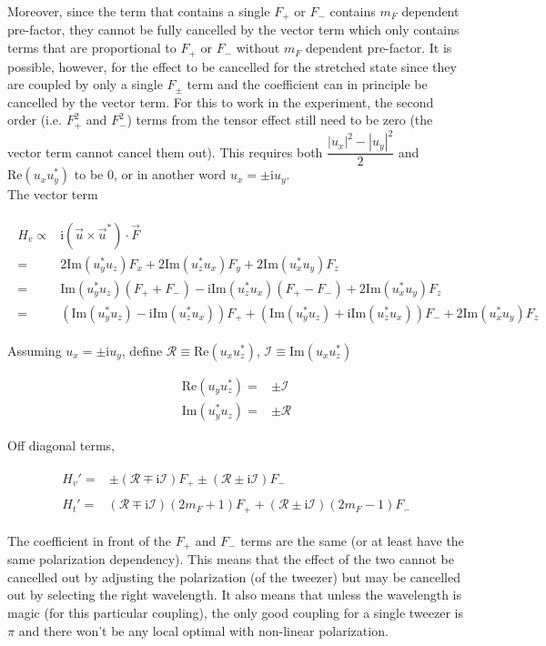 \documentclass[10pt,fleqn]{article}
\newcommand{\ui}{\mathrm{i}}
\newcommand{\eqar}[1]
{
  \begin{align}
    #1
  \end{align}
}
\newcommand{\paren}[1]{{\left({#1}\right)}}
\newcommand{\abs}[1]{{\left|{#1}\right|}}
\begin{document}
Moreover, since the term that contains a single $F_+$ or $F_-$
contains $m_F$ dependent pre-factor, they cannot be fully cancelled
by the vector term which only contains terms that are proportional to $F_+$ or $F_-$
without $m_F$ dependent pre-factor.
It is possible, however, for the effect to be cancelled for the stretched state
since they are coupled by only a single $F_\pm$ term and the coefficient can
in principle be cancelled by the vector term. For this to work in the experiment,
the second order (i.e. $F_+^2$ and $F_-^2$) terms from the tensor effect
still need to be zero (the vector term cannot cancel them out).
This requires both $\dfrac{\abs{u_x}^2-\abs{u_y}^2}{2}$ and
$\mathrm{Re}\paren{u_xu_y^*}$ to be $0$, or in another word $u_x=\pm\ui u_y$.\\

The vector term
\eqar{
  \begin{split}
    H_v\propto&\ui\paren{\vec{u}\times\vec{u}^*}\cdot\vec F\\
    =&2\mathrm{Im}\paren{u_y^*u_z}F_x
       +2\mathrm{Im}\paren{u_z^*u_x}F_y
       +2\mathrm{Im}\paren{u_x^*u_y}F_z\\
    =&\mathrm{Im}\paren{u_y^*u_z}\paren{F_++F_-}
       -\ui\mathrm{Im}\paren{u_z^*u_x}\paren{F_+-F_-}
       +2\mathrm{Im}\paren{u_x^*u_y}F_z\\
    =&\paren{\mathrm{Im}\paren{u_y^*u_z}-\ui\mathrm{Im}\paren{u_z^*u_x}}F_+
       +\paren{\mathrm{Im}\paren{u_y^*u_z}+\ui\mathrm{Im}\paren{u_z^*u_x}}F_-
       +2\mathrm{Im}\paren{u_x^*u_y}F_z
  \end{split}
}

Assuming $u_x=\pm\ui u_y$, define $\mathcal{R}\equiv\mathrm{Re}\paren{u_xu_z^*}$,
$\mathcal{I}\equiv\mathrm{Im}\paren{u_xu_z^*}$
\eqar{
  \mathrm{Re}\paren{u_yu_z^*}=&\pm\mathcal{I}\\
  \mathrm{Im}\paren{u_y^*u_z}=&\pm\mathcal{R}
}

Off diagonal terms,
\eqar{
  \begin{split}
    H_v'=&\pm\paren{\mathcal{R}\mp\ui\mathcal{I}}F_+
       \pm\paren{\mathcal{R}\pm\ui\mathcal{I}}F_-
  \end{split}\\
  \begin{split}
    H_t'=&\paren{\mathcal{R}\mp\ui\mathcal{I}}\paren{2m_F+1}F_+
           +\paren{\mathcal{R}\pm\ui\mathcal{I}}\paren{2m_F-1}F_-
  \end{split}
}

The coefficient in front of the $F_+$ and $F_-$ terms are the same
(or at least have the same polarization dependency).
This means that the effect of the two cannot be cancelled out
by adjusting the polarization (of the tweezer) but may be cancelled out
by selecting the right wavelength. It also means that unless the wavelength is magic
(for this particular coupling), the only good coupling for a single tweezer
is $\pi$ and there won't be any local optimal with non-linear polarization.
\end{document}
